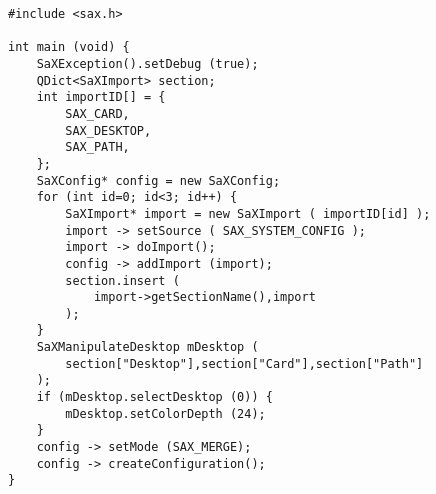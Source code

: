 \begin{Command}{12cm}
\begin{small}
\begin{verbatim}
#include <sax.h>

int main (void) {
    SaXException().setDebug (true);
    QDict<SaXImport> section;
    int importID[] = {
        SAX_CARD,
        SAX_DESKTOP,
        SAX_PATH,
    };
    SaXConfig* config = new SaXConfig;
    for (int id=0; id<3; id++) {
        SaXImport* import = new SaXImport ( importID[id] );
        import -> setSource ( SAX_SYSTEM_CONFIG );
        import -> doImport();
        config -> addImport (import);
        section.insert (
            import->getSectionName(),import
        );
    }
    SaXManipulateDesktop mDesktop (
        section["Desktop"],section["Card"],section["Path"]
    );
    if (mDesktop.selectDesktop (0)) {
        mDesktop.setColorDepth (24);
    }
    config -> setMode (SAX_MERGE);
    config -> createConfiguration();
}
\end{verbatim}
\end{small}
\end{Command}
